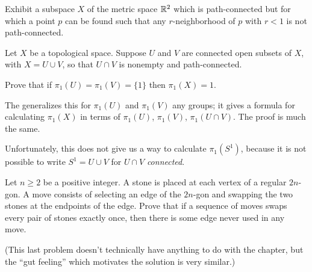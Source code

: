 \begin{problem}
	Exhibit a subspace $X$ of the metric space $\mathbb R^2$ which is
	path-connected but for which a point $p$ can be found such that
	any $r$-neighborhood of $p$ with $r < 1$ is not path-connected.
\end{problem}

\begin{dproblem}
	 \gim
	Let $X$ be a topological space.
	Suppose $U$ and $V$ are connected open subsets of $X$, with $X = U \cup V$,
	so that $U \cap V$ is nonempty and path-connected.
		
	Prove that if $\pi_1(U) = \pi_1(V) = \{1\}$ then $\pi_1(X) = 1$.
\end{dproblem}
\begin{remark}
	The  generalizes this 
	for $\pi_1(U)$ and $\pi_1(V)$ any groups; it gives a formula for calculating $\pi_1(X)$
	in terms of $\pi_1(U)$, $\pi_1(V)$, $\pi_1(U \cap V)$.
	The proof is much the same.
	
	Unfortunately, this does not give us a way to calculate $\pi_1(S^1)$,
	because it is not possible to write $S^1 = U \cup V$ for $U \cap V$ \emph{connected}.
\end{remark}

\begin{problem}
	[RMM 2013] \yod
	Let $n \ge 2$ be a positive integer.
	A stone is placed at each vertex of a regular $2n$-gon.
	A move consists of selecting an edge of the $2n$-gon and swapping the two stones at the endpoints of the edge.
	Prove that if a sequence of moves swaps every pair of stones exactly once, then there is some edge never used in any move.
\end{problem}
(This last problem doesn't technically have anything to do with the chapter,
but the ``gut feeling'' which motivates the solution is very similar.)
